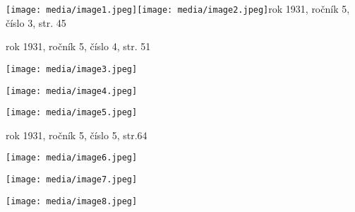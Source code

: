\texttt{[image: media/image1.jpeg]}\texttt{[image: media/image2.jpeg]}rok
1931, ročník 5, číslo 3, str. 45

rok 1931, ročník 5, číslo 4, str. 51

\texttt{[image: media/image3.jpeg]}

\texttt{[image: media/image4.jpeg]}

\texttt{[image: media/image5.jpeg]}

rok 1931, ročník 5, číslo 5, str.64

\texttt{[image: media/image6.jpeg]}

\texttt{[image: media/image7.jpeg]}

\texttt{[image: media/image8.jpeg]}

